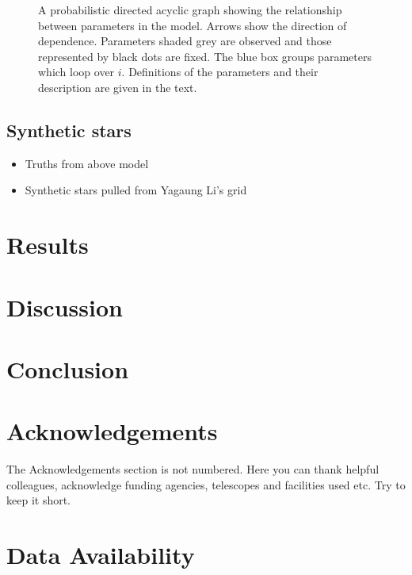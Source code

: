 \documentclass[fleqn,usenatbib]{mnras}
\begin{document}
\begin{figure}
    \centering
    
    \caption{A probabilistic directed acyclic graph showing the relationship between parameters in the model. Arrows show the direction of dependence.
    Parameters shaded grey are observed and those represented by black dots are fixed. 
    The blue box groups parameters which loop over \(i\). Definitions of the parameters and their description are given in the text.
    }
\end{figure}

\subsection{Synthetic stars}
\label{sec:synth}

\begin{itemize}
    \item Truths from above model
    \item Synthetic stars pulled from Yagaung Li's grid
\end{itemize}


\section{Results}
\label{sec:results}

\section{Discussion}
\label{sec:discussion}

\section{Conclusion}
\label{sec:conclusion}

\section*{Acknowledgements}

The Acknowledgements section is not numbered. Here you can thank helpful
colleagues, acknowledge funding agencies, telescopes and facilities used etc.
Try to keep it short.

\section*{Data Availability}
 
\end{document}
